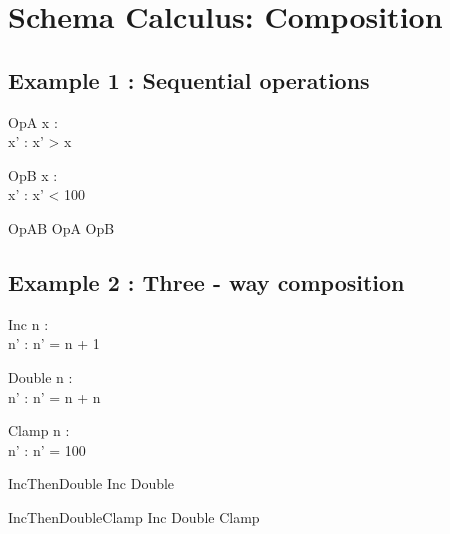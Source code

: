 \documentclass[a4paper,10pt,fleqn]{article}
\begin{document}
\section*{Schema Calculus: Composition}

\subsection*{Example 1 : Sequential operations}

\begin{schema}{OpA}
x : \nat \\
x' : \nat
\where
x' > x
\end{schema}

\begin{schema}{OpB}
x : \nat \\
x' : \nat
\where
x' < 100
\end{schema}

\begin{zed}
OpAB  OpA \semi OpB
\end{zed}

\subsection*{Example 2 : Three - way composition}

\begin{schema}{Inc}
n : \nat \\
n' : \nat
\where
n' = n + 1
\end{schema}

\begin{schema}{Double}
n : \nat \\
n' : \nat
\where
n' = n + n
\end{schema}

\begin{schema}{Clamp}
n : \nat \\
n' : \nat
\where
n' = 100
\end{schema}

\begin{zed}
IncThenDouble  Inc \semi Double
\end{zed}

\begin{zed}
IncThenDoubleClamp  Inc \semi Double \semi Clamp
\end{zed}
\end{document}
